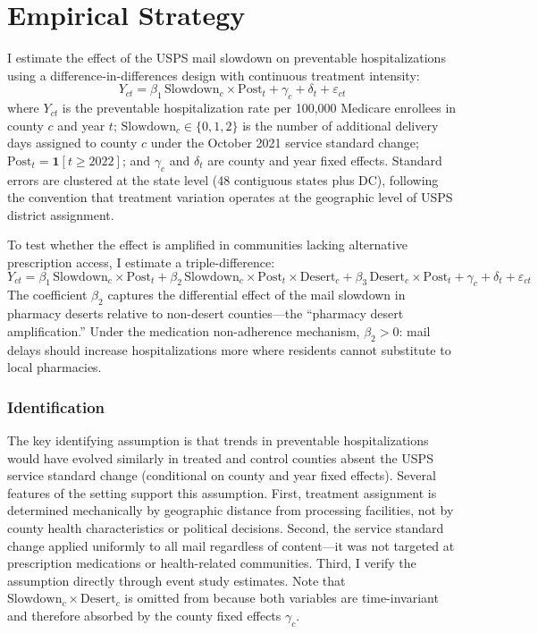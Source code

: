 \documentclass[12pt]{article}
\begin{document}


\section{Empirical Strategy}

I estimate the effect of the USPS mail slowdown on preventable hospitalizations using a difference-in-differences design with continuous treatment intensity:
\begin{equation}
\label{eq:main}
Y_{ct} = \beta_1 \, \text{Slowdown}_c \times \text{Post}_t + \gamma_c + \delta_t + \varepsilon_{ct}
\end{equation}
where $Y_{ct}$ is the preventable hospitalization rate per 100,000 Medicare enrollees in county $c$ and year $t$; $\text{Slowdown}_c \in \{0, 1, 2\}$ is the number of additional delivery days assigned to county $c$ under the October 2021 service standard change; $\text{Post}_t = \mathbf{1}[t \geq 2022]$; and $\gamma_c$ and $\delta_t$ are county and year fixed effects. Standard errors are clustered at the state level (48 contiguous states plus DC), following the convention that treatment variation operates at the geographic level of USPS district assignment.

To test whether the effect is amplified in communities lacking alternative prescription access, I estimate a triple-difference:
\begin{equation}
\label{eq:triple}
Y_{ct} = \beta_1 \, \text{Slowdown}_c \times \text{Post}_t + \beta_2 \, \text{Slowdown}_c \times \text{Post}_t \times \text{Desert}_c + \beta_3 \, \text{Desert}_c \times \text{Post}_t + \gamma_c + \delta_t + \varepsilon_{ct}
\end{equation}
The coefficient $\beta_2$ captures the differential effect of the mail slowdown in pharmacy deserts relative to non-desert counties---the ``pharmacy desert amplification.'' Under the medication non-adherence mechanism, $\beta_2 > 0$: mail delays should increase hospitalizations more where residents cannot substitute to local pharmacies.

\subsubsection*{Identification} The key identifying assumption is that trends in preventable hospitalizations would have evolved similarly in treated and control counties absent the USPS service standard change (conditional on county and year fixed effects). Several features of the setting support this assumption. First, treatment assignment is determined mechanically by geographic distance from processing facilities, not by county health characteristics or political decisions. Second, the service standard change applied uniformly to all mail regardless of content---it was not targeted at prescription medications or health-related communities. Third, I verify the assumption directly through event study estimates. Note that $\text{Slowdown}_c \times \text{Desert}_c$ is omitted from  because both variables are time-invariant and therefore absorbed by the county fixed effects $\gamma_c$.
\end{document}
